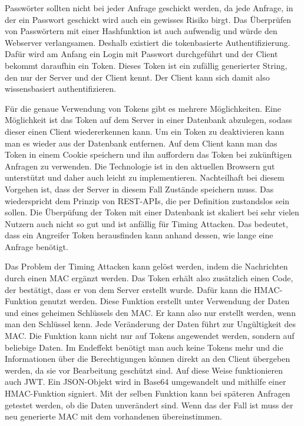 Passwörter sollten nicht bei jeder Anfrage geschickt werden, da jede Anfrage, in der ein Passwort geschickt wird auch ein gewisses Risiko birgt. Das Überprüfen von Passwörtern mit einer Hashfunktion ist auch aufwendig und würde den Webserver verlangsamen. Deshalb existiert die tokenbasierte Authentifizierung. Dafür wird am Anfang ein Login mit Passwort durchgeführt und der Client bekommt daraufhin ein Token. Dieses Token ist ein zufällig generierter String, den nur der Server und der Client kennt. Der Client kann sich damit also wissensbasiert authentifizieren. 

Für die genaue Verwendung von Tokens gibt es mehrere Möglichkeiten. Eine Möglichkeit ist das Token auf dem Server in einer Datenbank abzulegen, sodass dieser einen Client wiedererkennen kann. Um ein Token zu deaktivieren kann man es wieder aus der Datenbank entfernen. Auf dem Client kann man das Token in einem Cookie speichern und ihn auffordern das Token bei zukünftigen Anfragen zu verwenden. Die Technologie ist in den aktuellen Browsern gut unterstützt und daher auch leicht zu implementieren. Nachteilhaft bei diesem Vorgehen ist, dass der Server in diesem Fall Zustände speichern muss. Das wiederspricht dem Prinzip von REST-APIs, die per Definition zustandslos sein sollen. Die Überpüfung der Token mit einer Datenbank ist skaliert bei sehr vielen Nutzern auch nicht so gut und ist anfällig für Timing Attacken. Das bedeutet, dass ein Angreifer Token herausfinden kann anhand dessen, wie lange eine Anfrage benötigt.

Das Problem der Timing Attacken kann gelöst werden, indem die Nachrichten durch einen \ac{MAC} ergänzt werden. Das Token erhält also zusätzlich einen Code, der bestätigt, dass er von dem Server erstellt wurde. Dafür kann die \ac{HMAC}-Funktion genutzt werden. Diese Funktion erstellt unter Verwendung der Daten und eines geheimen Schlüssels den \ac{MAC}. Er kann also nur erstellt werden, wenn man den Schlüssel kenn. Jede Veränderung der Daten führt zur Ungültigkeit des \ac{MAC}. Die Funktion kann nicht nur auf Tokens angewendet werden, sondern auf beliebige Daten. Im Endeffekt benötigt man auch keine Tokens mehr und die Informationen über die Berechtigungen können direkt an den Client übergeben werden, da sie vor Bearbeitung geschützt sind. Auf diese Weise funktionieren auch \ac{JWT}. Ein JSON-Objekt wird in Base64 umgewandelt und mithilfe einer \ac{HMAC}-Funktion signiert. Mit der selben Funktion kann bei späteren Anfragen getestet werden, ob die Daten unverändert sind. Wenn das der Fall ist muss der neu generierte \ac{MAC} mit dem vorhandenen übereinstimmen.
\cite{madden_api_2020}\cite{software_development_engineering_advisor_at_fiserv_usa_architecting_2023}


